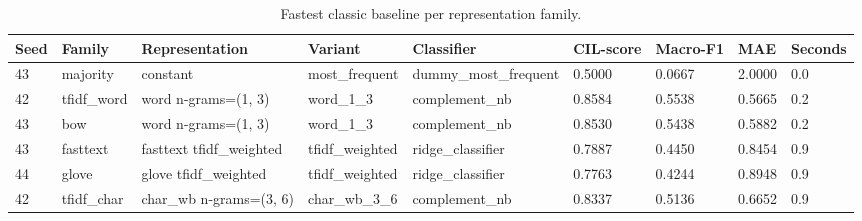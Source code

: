 \begin{table}[htbp]
\centering
\caption{Fastest classic baseline per representation family.}
\label{tab:classic-fastest-families}
\begin{tabular}{lllllllll}
\toprule
Seed & Family & Representation & Variant & Classifier & CIL-score & Macro-F1 & MAE & Seconds \\
\midrule
43 & majority & constant & most\_frequent & dummy\_most\_frequent & 0.5000 & 0.0667 & 2.0000 & 0.0 \\
42 & tfidf\_word & word n-grams=(1, 3) & word\_1\_3 & complement\_nb & 0.8584 & 0.5538 & 0.5665 & 0.2 \\
43 & bow & word n-grams=(1, 3) & word\_1\_3 & complement\_nb & 0.8530 & 0.5438 & 0.5882 & 0.2 \\
43 & fasttext & fasttext tfidf\_weighted & tfidf\_weighted & ridge\_classifier & 0.7887 & 0.4450 & 0.8454 & 0.9 \\
44 & glove & glove tfidf\_weighted & tfidf\_weighted & ridge\_classifier & 0.7763 & 0.4244 & 0.8948 & 0.9 \\
42 & tfidf\_char & char\_wb n-grams=(3, 6) & char\_wb\_3\_6 & complement\_nb & 0.8337 & 0.5136 & 0.6652 & 0.9 \\
\bottomrule
\end{tabular}
\end{table}
